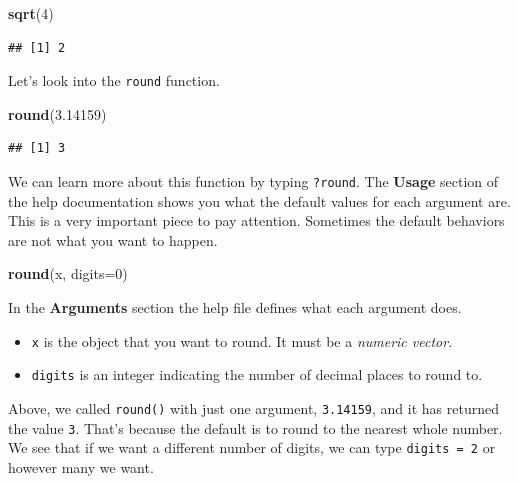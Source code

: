 \documentclass[
]{article}
\newenvironment{Shaded}{\begin{snugshade}}{\end{snugshade}}
\newcommand{\DataTypeTok}[1]{\textcolor[rgb]{0.13,0.29,0.53}{#1}}
\newcommand{\DecValTok}[1]{\textcolor[rgb]{0.00,0.00,0.81}{#1}}
\newcommand{\FloatTok}[1]{\textcolor[rgb]{0.00,0.00,0.81}{#1}}
\newcommand{\KeywordTok}[1]{\textcolor[rgb]{0.13,0.29,0.53}{\textbf{#1}}}
\newcommand{\NormalTok}[1]{#1}
\providecommand{\tightlist}{%
  \setlength{\itemsep}{0pt}\setlength{\parskip}{0pt}}
\begin{document}
\begin{Shaded}
\begin{Highlighting}[]
\KeywordTok{sqrt}\NormalTok{(}\DecValTok{4}\NormalTok{)}
\end{Highlighting}
\end{Shaded}

\begin{verbatim}
## [1] 2
\end{verbatim}

Let's look into the \texttt{round} function.

\begin{Shaded}
\begin{Highlighting}[]
\KeywordTok{round}\NormalTok{(}\FloatTok{3.14159}\NormalTok{)}
\end{Highlighting}
\end{Shaded}

\begin{verbatim}
## [1] 3
\end{verbatim}

We can learn more about this function by typing \texttt{?round}. The
\textbf{Usage} section of the help documentation shows you what the
default values for each argument are. This is a very important piece to
pay attention. Sometimes the default behaviors are not what you want to
happen.

\begin{Shaded}
\begin{Highlighting}[]
\KeywordTok{round}\NormalTok{(x, }\DataTypeTok{digits=}\DecValTok{0}\NormalTok{)}
\end{Highlighting}
\end{Shaded}

In the \textbf{Arguments} section the help file defines what each
argument does.

\begin{itemize}
\tightlist
\item
  \texttt{x} is the object that you want to round. It must be a
  \emph{numeric vector}.
\item
  \texttt{digits} is an integer indicating the number of decimal places
  to round to.
\end{itemize}

Above, we called \texttt{round()} with just one argument,
\texttt{3.14159}, and it has returned the value \texttt{3}. That's
because the default is to round to the nearest whole number. We see that
if we want a different number of digits, we can type
\texttt{digits\ =\ 2} or however many we want.
\end{document}

